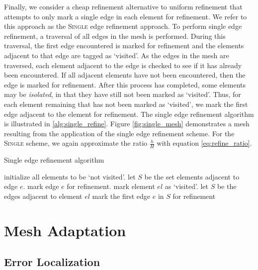Finally, we consider a cheap refinement alternative to
uniform refinement that attempts to only mark a single edge
in each element for refinement. We refer to this approach
as the \textsc{Single} edge refinement approach.
To perform single edge refinement, a traversal of all
edges in the mesh is performed. During this traversal,
the first edge encountered is marked for refinement
and the elements adjacent to that edge are tagged
as `visited'. As the edges in the mesh are traversed,
each element adjacent to the edge is checked to see
if it has already been encountered. If all adjacent
elements have not been encountered, then the edge
is marked for refinement.
After this process has completed, some elements may be
\emph{isolated}, in that they have still not been marked as `visited'.
Thus, for each element remaining that has not been marked as `visited',
we mark the first edge adjacent to the element for refinement.
The single edge refinement
algorithm is illustrated in \ref{alg:single_refine}.
Figure \ref{fig:single_mesh} demonstrates a mesh
resulting from the application of the single
edge refinement scheme. For the \textsc{Single}
scheme, we again approximate the ratio
$\frac{h}{H}$ with equation \eqref{eq:refine_ratio}.

\begin{algorithm}
\caption{Single edge refinement algorithm}
\begin{algorithmic}
\State initialize all elements to be `not visited'.
\State let $S$ be the set elements adjacent to edge $e$.
\State mark edge $e$ for refinement.
\State mark element $el$ as `visited'.
\EndFor
\EndIf
\EndFor
{}
\State let $S$ be the edges adjacent to element $el$
\State mark the first edge $e$ in $S$ for refinement
\EndIf
\EndFor
\end{algorithmic}
\label{alg:single_refine}
\end{algorithm}

\section{Mesh Adaptation}

\subsection{Error Localization}

